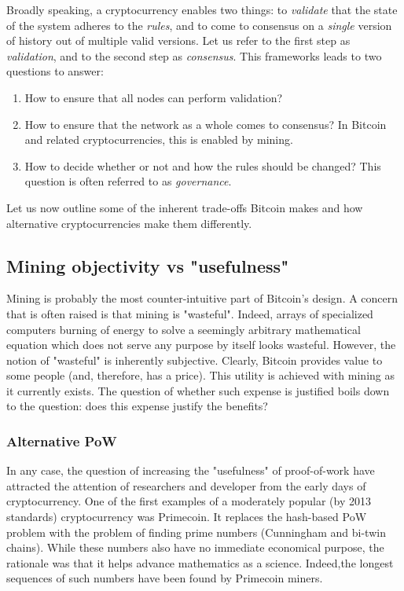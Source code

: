 Broadly speaking, a cryptocurrency enables two things: to \textit{validate} that the state of the system adheres to the \textit{rules}, and to come to consensus on a \textit{single} version of history out of multiple valid versions.
Let us refer to the first step as \textit{validation}, and to the second step as \textit{consensus}.
This frameworks leads to two questions to answer:
\begin{enumerate}
	\item How to ensure that all nodes can perform validation?
	\item How to ensure that the network as a whole comes to consensus? In Bitcoin and related cryptocurrencies, this is enabled by mining.
	\item How to decide whether or not and how the rules should be changed? This question is often referred to as \textit{governance}.
\end{enumerate}

Let us now outline some of the inherent trade-offs Bitcoin makes and how alternative cryptocurrencies make them differently.

\subsection{Mining objectivity vs "usefulness"}

Mining is probably the most counter-intuitive part of Bitcoin's design.
A concern that is often raised is that mining is "wasteful".
Indeed, arrays of specialized computers burning  of energy to solve a seemingly arbitrary mathematical equation which does not serve any purpose by itself looks wasteful.
However, the notion of "wasteful" is inherently subjective.
Clearly, Bitcoin provides value to some people (and, therefore, has a price).
This utility is achieved with mining as it currently exists.
The question of whether such expense is justified boils down to the question: does this expense justify the benefits?

\subsubsection*{Alternative PoW}
In any case, the question of increasing the "usefulness" of proof-of-work have attracted the attention of researchers and developer from the early days of cryptocurrency.
One of the first examples of a moderately popular (by 2013 standards) cryptocurrency was Primecoin.
It replaces the hash-based PoW problem with the problem of finding prime numbers (Cunningham and bi-twin chains).
While these numbers also have no immediate economical purpose, the rationale was that it helps advance mathematics as a science.
Indeed,the longest sequences of such numbers have been found by Primecoin miners.

